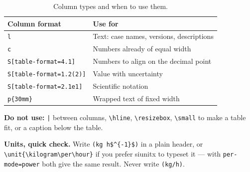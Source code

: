 \documentclass[11pt,a4paper]{article}
\begin{document}
\begin{table}[!htb]
  \centering
  \caption{Column types and when to use them.}
  \label{tab:column-types}
  \begin{tabular}{ll}
    \toprule
    Column format & Use for \\
    \midrule
    \verb|l|                        & Text: case names, versions, descriptions \\
    \verb|c|                        & Numbers already of equal width \\
    \verb|S[table-format=4.1]|      & Numbers to align on the decimal point \\
    \verb|S[table-format=1.2(2)]|   & Value with uncertainty \\
    \verb|S[table-format=2.1e1]|    & Scientific notation \\
    \verb|p{30mm}|                  & Wrapped text of fixed width \\
    \bottomrule
  \end{tabular}
\end{table}

\noindent
\textbf{Do not use:} \verb!|! between columns, \verb|\hline|,
\verb|\resizebox|, \verb|\small| to make a table fit, or a caption below
the table.

\bigskip
\noindent
\textbf{Units, quick check.} Write \verb|(kg h$^{-1}$)| in a plain header,
or \verb|\unit{\kilogram\per\hour}| if you prefer siunitx to typeset it ---
with \verb|per-mode=power| both give the same result. Never write
\verb|(kg/h)|.
\end{document}
